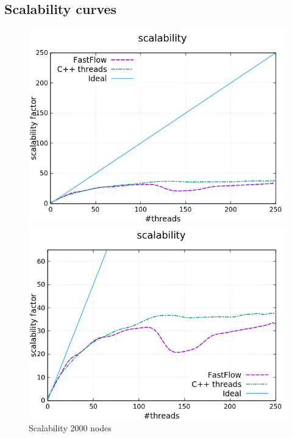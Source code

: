 \subsection{Scalability curves}
\begin{figure}[H]
	\centering
\begin{minipage}[t]{0.50\linewidth}
	\includegraphics[width=\linewidth]{benchmark/curves/scalability_standard_2000_20000.png}
	\vspace{0.2em}
\end{minipage}%
\begin{minipage}[t]{0.50\linewidth}
	\includegraphics[width=\linewidth]{benchmark/curves/scalability_zoom_2000_20000.png}
\end{minipage}
\caption{Scalability 2000 nodes}\label{fig:scalability2000}
\end{figure}


